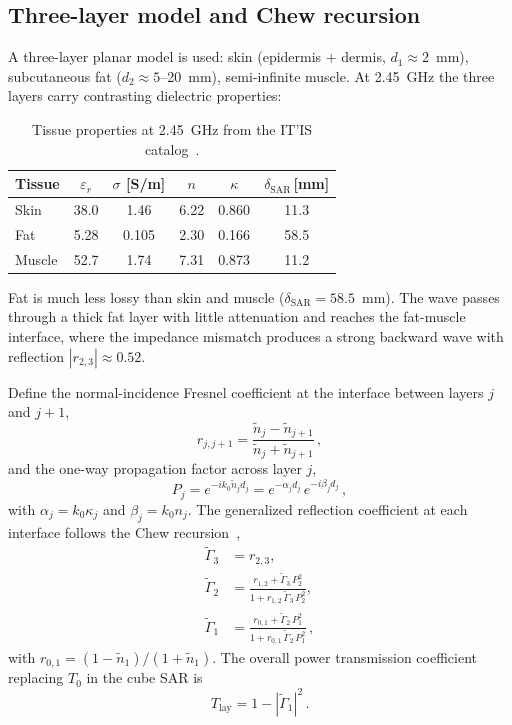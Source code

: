 \documentclass[journal,twocolumn,10pt]{IEEEtran}
\theoremstyle{plain}
\theoremstyle{remark}
\newcommand{\Tlay}{T_{\mathrm{lay}}}
\newcommand{\ntilde}{\tilde{n}}
\begin{document}
\subsection{Three-layer model and Chew recursion}
A three-layer planar model is used:
skin (epidermis + dermis, $d_1 \approx 2$~mm), subcutaneous fat
($d_2 \approx 5$--20~mm), semi-infinite muscle. At 2.45~GHz
the three layers carry contrasting dielectric properties:

\begin{table}[!t]
\centering
\caption{Tissue properties at 2.45~GHz from the IT'IS
catalog~\cite{ITISv5,Gabriel1996}.}
\label{tab:layers-2g45}
\begin{tabular}{lccccc}
\toprule
Tissue & $\varepsilon_r$ & $\sigma$ [S/m] & $n$ & $\kappa$
  & $\delta_{\mathrm{SAR}}$\,[mm] \\
\midrule
Skin   & 38.0 & 1.46  & 6.22 & 0.860 & 11.3 \\
Fat    &  5.28 & 0.105 & 2.30 & 0.166 & 58.5 \\
Muscle & 52.7 & 1.74  & 7.31 & 0.873 & 11.2 \\
\bottomrule
\end{tabular}
\end{table}

Fat is much less lossy than skin and muscle
($\delta_{\mathrm{SAR}} = 58.5$~mm). The wave passes through a thick
fat layer with little attenuation and reaches the fat-muscle
interface, where the impedance mismatch produces a strong backward
wave with reflection $|r_{2,3}| \approx 0.52$.

Define the normal-incidence Fresnel coefficient at the interface
between layers $j$ and $j+1$,
\begin{equation}\label{eq:rjj1-SI}
  r_{j,j+1} = \frac{\ntilde_j - \ntilde_{j+1}}{\ntilde_j + \ntilde_{j+1}}\, ,
\end{equation}
and the one-way propagation factor across layer $j$,
\begin{equation}\label{eq:Pj-SI}
  P_j = e^{-i k_0 \ntilde_j d_j} = e^{-\alpha_j d_j}\,e^{-i\beta_j d_j}\, ,
\end{equation}
with $\alpha_j = k_0\kappa_j$ and $\beta_j = k_0 n_j$. The
generalized reflection coefficient at each interface follows the
Chew recursion~\cite{Chew1995},
\begin{align}
  \widetilde\Gamma_3 &= r_{2,3},\label{eq:Gamma3-SI}\\
  \widetilde\Gamma_2 &= \frac{r_{1,2}
    + \widetilde\Gamma_3\,P_2^{2}}
    {1 + r_{1,2}\,\widetilde\Gamma_3\,P_2^{2}},
    \label{eq:Gamma2-SI}\\
  \widetilde\Gamma_1 &= \frac{r_{0,1}
    + \widetilde\Gamma_2\,P_1^{2}}
    {1 + r_{0,1}\,\widetilde\Gamma_2\,P_1^{2}}\, ,
    \label{eq:Gamma1-SI}
\end{align}
with $r_{0,1} = (1 - \ntilde_1)/(1 + \ntilde_1)$. The overall power
transmission coefficient replacing $T_0$ in the cube SAR is
\begin{equation}\label{eq:T-layered-SI}
  \Tlay = 1 - |\widetilde\Gamma_1|^2\, .
\end{equation}
\end{document}
